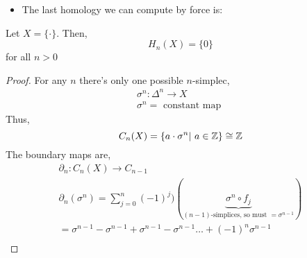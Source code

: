\documentclass[../notes.tex]{subfiles}
\begin{document}
\begin{itemize}
    \item The last homology we can compute by force is:
\end{itemize}
\begin{theorem}
    Let $X=\{\cdot\}$. Then,
    \[
        H_n(X)=\{0\}
    \]
    for all $n\gt 0$
\end{theorem}
\begin{proof}
    For any $n$ there's only one possible $n$-simplec,
    \begin{align*}
        \sigma^n:\Delta^n\rightarrow X\\
        \sigma^n=\text{ constant map }
    \end{align*}
    Thus,
    \[
        C_n(X)=\{a\cdot \sigma^n|\ a\in \mathbb{Z}\}\cong \mathbb{Z}
    \]
    The boundary maps are,
    \begin{align*}
        \partial_n: C_n(X)\rightarrow C_{n-1}\\
        \partial_n(\sigma^n)=\sum_{j=0}^n(-1)^j)(\underbrace{\sigma^n\circ f_j}_{
            (n-1)\text{-simplices, so must $=\sigma^{n-1}$}
        })\\
        =\sigma^{n-1} -\sigma^{n-1} +\sigma^{n-1} -\sigma^{n-1} \dots +(-1)^n\sigma^{n-1}\\
    \end{align*}
\end{proof}
\end{document}
